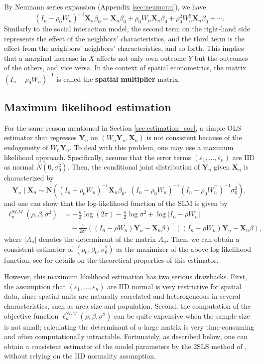 \documentclass[10.5pt, A4paper, openany, uplatex]{book}
\newcommand{\mbf}{\mathbf}
\newcommand{\eps}{\varepsilon}
\numberwithin{equation}{section}
\begin{document}
By Neumann series expansion (Appendix \ref{sec:neumann}), we have 
\[
	(I_n - \rho_0 W_n)^{-1}\mbf{X}_n\beta_0 = \mbf{X}_n\beta_0 + \rho_0 W_n \mbf{X}_n\beta_0 + \rho_0^2 W_n^2\mbf{X}_n\beta_0 + \cdots.
\]
Similarly to the social interaction model, the second term on the right-hand side represents the effect of the neighbors' characteristics, and the third term is the effect from the neighbors' neighbors' characteristics, and so forth.
This implies that a marginal increase in $X$ affects not only own outcome $Y$ but the outcomes of the others, and vice versa.
In the context of spatial econometrics, the matrix $(I_n - \rho_0 W_n)^{-1} $ is called the \textbf{spatial multiplier} matrix.

\subsection{Maximum likelihood estimation}

 For the same reason mentioned in Section \ref{sec:estimation_soc}, a simple OLS estimator that regresses $\mbf{Y}_n$ on $(W_n \mbf{Y}_n, \mbf{X}_n)$ is not consistent because of the endogeneity of $W_n \mbf{Y}_n$.
 To deal with this problem, one may use a maximum likelihood approach.
 Specifically, assume that the error terms $(\eps_1, \ldots , \eps_n)$ are IID as normal $N(0, \sigma_0^2)$.
 Then, the conditional joint distribution of $\mbf{Y}_n$ given $\mbf{X}_n$ is characterized by
 \[
 	\mbf{Y}_n \mid \mbf{X}_n \sim \mbf{N}\left( (I_n - \rho_0 W_n)^{-1}\mbf{X}_n \beta_0, \; (I_n - \rho_0 W_n)^{-1}(I_n - \rho_0 W_n^\top)^{-1}\sigma_0^2\right),
 \]
and one can show that the log-likelihood function of the SLM is given by
\begin{align*}
 	\ell^{SLM}_n(\rho, \beta, \sigma^2) 
 	&= -\frac{n}{2} \log (2\pi) -\frac{n}{2} \log\sigma^2 + \log | I_n - \rho W_n| \\
 	& \quad - \frac{1}{2\sigma^2} ((I_n - \rho W_n)\mbf{Y}_n - \mbf{X}_n \beta)^\top ((I_n - \rho W_n)\mbf{Y}_n - \mbf{X}_n \beta),
 \end{align*}
where $|A_n|$ denotes the determinant of the matrix $A_n$.
Then, we can obtain a consistent estimator of $(\rho_0, \beta_0, \sigma_0^2)$ as the maximizer of the above log-likelihood function; see \cite{lee2004asymptotic} for details on the theoretical properties of this estimator.

However, this maximum likelihood estimation has two serious drawbacks.
First, the assumption that $(\eps_1, \ldots , \eps_n)$ are IID normal is very restrictive for spatial data, since spatial units are naturally correlated and heterogeneous in several characteristics, such as area size and population.
Second, the computation of the objective function $\ell^{SLM}_n(\rho, \beta, \sigma^2)$ can be quite expensive when the sample size is not small; calculating the determinant of a large matrix is very time-consuming and often computationally intractable.
Fortunately, as described below, one can obtain a consistent estimator of the model parameters by the 2SLS method of \cite{kelejian1998generalized}, without relying on the IID normality assumption.
\end{document}
